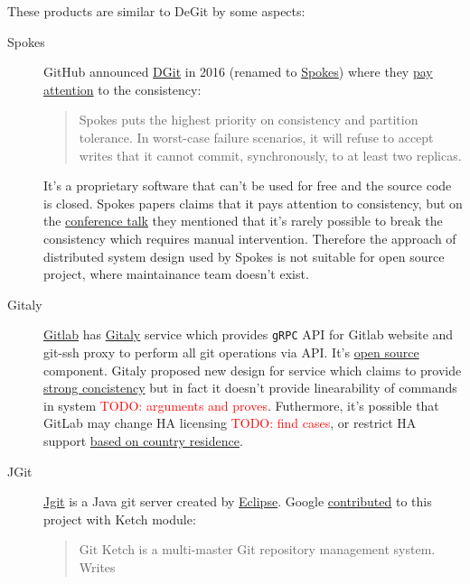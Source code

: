 \documentclass[12pt,oneside]{article}
\newcommand{\code}[1]{\texttt{#1}}
\newcommand{\todo}[1]{\textcolor{red}{TODO: #1}}
\begin{document}
These products are similar to DeGit by some aspects:
\begin{description}
  \item[Spokes]
    GitHub announced \href{https://github.blog/2016-04-05-introducing-dgit/}{DGit}
    in 2016 (renamed to \href{https://github.blog/2016-09-07-building-resilience-in-spokes/}{Spokes})
    where they \href{https://github.blog/2016-09-07-building-resilience-in-spokes/#defining-resilience}{pay attention}
    to the consistency:
    \begin{quote}
      Spokes puts the highest priority on consistency and partition tolerance.
      In worst-case failure scenarios, it will refuse to accept writes that it cannot commit,
      synchronously, to at least two replicas.
    \end{quote}
    It's a proprietary software that can't be used for free and the source code is closed.
    Spokes papers claims that it pays attention to consistency, but on the
    \href{https://www.youtube.com/watch?v=DY0yNRNkYb0}{conference talk} they mentioned that
    it's rarely possible to break the consistency which requires manual intervention.
    Therefore the approach of distributed system design used by Spokes is not suitable for open
    source project, where maintainance team doesn't exist.
  \item[Gitaly]
    \href{https://docs.gitlab.com/ee/README.html}{Gitlab} has
    \href{https://docs.gitlab.com/ee/administration/gitaly/}{Gitaly} service which provides
    \code{gRPC} API for Gitlab website and git-ssh proxy to perform all git operations via API.
    It's \href{https://gitlab.com/gitlab-org/gitaly}{open source} component.
    Gitaly proposed new design for service which claims to provide
    \href{https://gitlab.com/gitlab-org/gitaly/-/blob/master/doc/design\_ha.md\#strong-consistency-design}{strong concistency}
    but in fact it doesn't provide linearability of commands in system \todo{arguments and proves}.
    Futhermore, it's possible that GitLab may change HA licensing \todo{find cases},
    or restrict HA support \href{https://news.ycombinator.com/item?id=21437334}{based on country residence}.
  \item[JGit]
    \href{https://www.eclipse.org/jgit/}{Jgit} is a Java git server created by \href{https://www.eclipse.org/}{Eclipse}.
    Google \href{https://www.eclipse.org//lists/jgit-dev/msg03073.html}{contributed} to this project with Ketch module:
    \begin{quote}
      Git Ketch is a multi-master Git repository management system. Writes

\end{quote}
\end{description}
\end{document}

